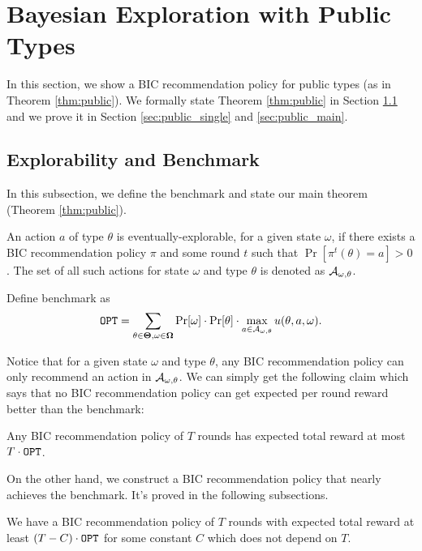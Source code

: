 
\section{Bayesian Exploration with Public Types}
\label{sec:public}
In this section, we show a BIC recommendation policy for public types (as in Theorem \ref{thm:public}). We formally state Theorem \ref{thm:public} in Section \ref{sec:public_bench} and we prove it in Section \ref{sec:public_single} and \ref{sec:public_main}.

\subsection{Explorability and Benchmark}
\label{sec:public_bench}
In this subsection, we define the benchmark and state our main theorem (Theorem \ref{thm:public}).

\begin{definition}
\label{def:public_exp}
An action $a$ of type $\theta$ is eventually-explorable, for a given state $\omega$, if there exists a BIC recommendation policy $\pi$ and some round $t$ such that $\Pr[\pi^t(\theta)= a]> 0$. The set of all such actions for state $\omega$ and type $\theta$ is denoted as $\mathcal{A}_{\omega,\theta}$.
\end{definition}

\begin{definition}[Benchmark]
Define benchmark as
\[
\mathtt{OPT} = \sum_{\theta \in \bold{\Theta}, \omega\in \bold{\Omega}} \Pr[\omega] \cdot \Pr[\theta] \cdot \max_{a \in \mathcal{A}_{\omega,\theta}} u(\theta, a, \omega).
\]
\end{definition}

Notice that for a given state $\omega$ and type $\theta$, any BIC recommendation policy can only recommend an action in $\mathcal{A}_{\omega,\theta}$. We can simply get the following claim which says that no BIC recommendation policy can get expected per round reward better than the benchmark:
\begin{claim}
Any BIC recommendation policy of $T$ rounds has expected total reward at most $T \cdot\mathtt{OPT}$.
\end{claim}

On the other hand, we construct a BIC recommendation policy that nearly achieves the benchmark. It's proved in the following subsections.
\begin{theorem}
\label{thm:public}
We have a BIC recommendation policy of $T$ rounds with expected total reward at least $\left(T - C \right) \cdot \mathtt{OPT}$ for some constant $C$ which does not depend on $T$.
\end{theorem}

